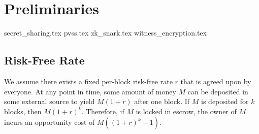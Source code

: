 \section{Preliminaries}
    {secret_sharing.tex}
    {pvss.tex}
    {zk_snark.tex}
    {witness_encryption.tex}
    \subsection{Risk-Free Rate}
    We assume there exists a fixed per-block risk-free rate $r$ that is agreed upon by everyone.
    At any point in time, some amount of money $M$ can be deposited in some external source to yield $M(1 + r)$ after one block.
    If $M$ is deposited for $k$ blocks, then $M(1 + r)^k$.
    Therefore, if $M$ is locked in escrow, the owner of $M$ incurs an opportunity cost of $M((1 + r)^k - 1)$.

